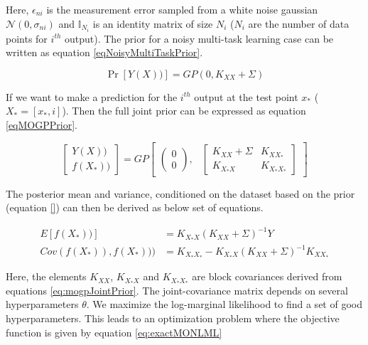 Here, \(\epsilon_{ni}\) is the measurement error sampled from a white noise gaussian \(\mathcal{N}(0, \sigma_{ni})\) and \(\mathbb{I}_{N_{i}}\) is an identity matrix of size \(N_{i}\) (\(N_{i}\) are the number of data points for \(i^{th}\) output). The prior for a noisy multi-task learning case can be written as equation \ref{eqNoisyMultiTaskPrior}.

\begin{equation}\label{eqNoisyMultiTaskPrior}
         \Pr[Y(X))] = GP(0, K_{XX} + \Sigma)
\end{equation}
      
If we want to make a prediction for the $i^{th}$ output at the test point $x_{*}$ ($X_{*} = [x_{*}, i]$). Then the full joint prior can be expressed as equation \ref{eqMOGPPrior}.
 
 \begin{equation}\label{eqMOGPPrior}
 \begin{bmatrix}
   Y(X))\\ 
   f(X_{*}))
   \end{bmatrix} = GP\begin{bmatrix}
   \begin{pmatrix}
   0\\ 
   0
   \end{pmatrix}, 
   & 
   \begin{bmatrix}
   K_{XX} + \Sigma & K_{XX_{*}}\\ 
   K_{X_{*}X} & K_{X_{*}X_{*}}
   \end{bmatrix} 

   \end{bmatrix} 
 \end{equation}

  
The posterior mean and variance, conditioned on the dataset based on the prior (equation \ref{}) can then be derived as below set of equations.

\begin{align}
  E[f(X_{*}))] & = K_{X_{*}X}\left ( K_{XX} + \Sigma \right )^{-1}Y \label{eq:predictiveMOMean} \\ 
  Cov(f(X_{*})), f(X_{*}))) & = K_{X_{*}X_{*}} - K_{X_{*}X}\left ( K_{XX} + \Sigma \right )^{-1}K_{XX_{*}} \label{eq:predictiveMOCovariance}
\end{align}
  
Here, the elements \(K_{XX}\), \(K_{X_{*}X}\) and \(K_{X_{*}X_{*}}\) are block covariances derived from equations \ref{eq:mogpJointPrior}. The joint-covariance matrix depends on several hyperparameters \(\theta\). We maximize the log-marginal likelihood to find a set of good hyperparameters. This leads to an optimization problem where the objective function is given by equation \ref{eq:exactMONLML} 
  
